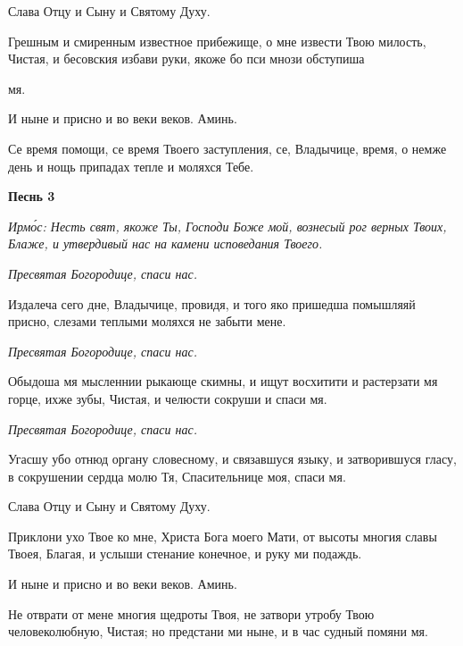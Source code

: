    Слава Отцу и Сыну и Святому Духу.



   Грешным и смиренным известное прибежище, о мне извести Твою
милость, Чистая, и бесовския избави руки, якоже бо пси мнози обступиша

мя.



   И ныне и присно и во веки веков. Аминь.



   Се время помощи, се время Твоего заступления, се, Владычице, время, о
немже день и нощь припадах тепле и моляхся Тебе.



 

\bfseries Песнь 3\normalfont{}


 \itshape Ирмо́с:\normalfont{} Несть свят, якоже Ты, Господи Боже мой, вознесый рог верных Твоих,
Блаже, и утвердивый нас на камени исповедания Твоего.



 \itshape  Пресвятая Богородице, спаси нас.
\normalfont{}


   Издалеча сего дне, Владычице, провидя, и того яко пришедша
помышляяй присно, слезами теплыми моляхся не забыти мене.



 \itshape  Пресвятая Богородице, спаси нас.
\normalfont{}


   Обыдоша мя мысленнии рыкающе скимны, и ищут восхитити и
растерзати мя горце, ихже зубы, Чистая, и челюсти сокруши и спаси
мя.



 \itshape  Пресвятая Богородице, спаси нас.
\normalfont{}


   Угасшу убо отнюд органу словесному, и связавшуся языку, и
затворившуся гласу, в сокрушении сердца молю Тя, Спасительнице моя,
спаси мя.



   Слава Отцу и Сыну и Святому Духу.



   Приклони ухо Твое ко мне, Христа Бога моего Мати, от высоты
многия славы Твоея, Благая, и услыши стенание конечное, и руку ми
подаждь.



   И ныне и присно и во веки веков. Аминь.



   Не отврати от мене многия щедроты Твоя, не затвори утробу Твою
человеколюбную, Чистая; но предстани ми ныне, и в час судный помяни
мя.



